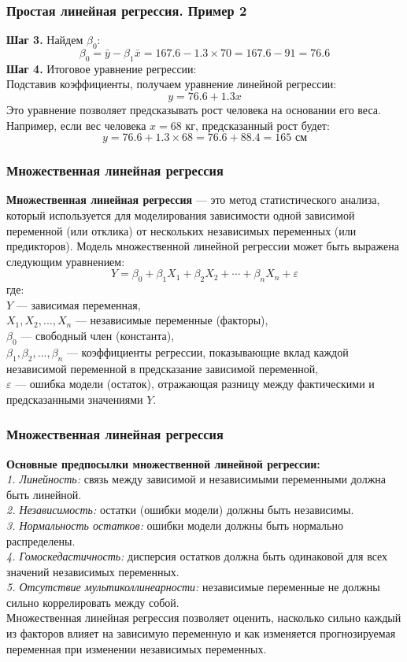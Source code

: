 \documentclass[aspectratio=169]{beamer}
\begin{document}
\begin{frame}
\frametitle{Простая линейная регрессия. Пример 2}
{\bf Шаг 3.} Найдем \( \beta_0 \):
\[
\beta_0 = \bar{y} - \beta_1 \bar{x} = 167.6 - 1.3 \times 70 = 167.6 - 91 = 76.6
\]
{\bf Шаг 4.} Итоговое уравнение регрессии:\\
Подставив коэффициенты, получаем уравнение линейной регрессии:
\[
y = 76.6 + 1.3x
\]
Это уравнение позволяет предсказывать рост человека на основании его веса. Например, если вес человека \( x = 68 \) кг, предсказанный рост будет:
\[
y = 76.6 + 1.3 \times 68 = 76.6 + 88.4 = 165 \text{ см}
\]
\end{frame}

\begin{frame}
\frametitle{Множественная линейная регрессия}
{\bf Множественная линейная регрессия} — это метод статистического анализа, который используется для моделирования зависимости одной зависимой переменной (или отклика) от нескольких независимых переменных (или предикторов). Модель множественной линейной регрессии может быть выражена следующим уравнением:
\[
Y = \beta_0 + \beta_1 X_1 + \beta_2 X_2 + \cdots + \beta_n X_n + \varepsilon
\]
где:\\
\quad \(Y\) — зависимая переменная,\\
\quad \(X_1, X_2, ..., X_n\) — независимые переменные (факторы),\\
\quad \(\beta_0\) — свободный член (константа),\\
\quad \(\beta_1, \beta_2, ..., \beta_n\) — коэффициенты регрессии, показывающие вклад каждой независимой переменной в предсказание зависимой переменной,\\
\quad \(\varepsilon\) — ошибка модели (остаток), отражающая разницу между фактическими и предсказанными значениями \(Y\).
\end{frame}

\begin{frame}
\frametitle{Множественная линейная регрессия}
{\bf Основные предпосылки множественной линейной регрессии:}\\
{\it 1. Линейность:} связь между зависимой и независимыми переменными должна быть линейной.\\
{\it 2. Независимость:} остатки (ошибки модели) должны быть независимы.\\
{\it 3. Нормальность остатков:} ошибки модели должны быть нормально распределены.\\
{\it 4. Гомоскедастичность:} дисперсия остатков должна быть одинаковой для всех значений независимых переменных.\\
{\it 5. Отсутствие мультиколлинеарности:} независимые переменные не должны сильно коррелировать между собой.
\newline\\
Множественная линейная регрессия позволяет оценить, насколько сильно каждый из факторов влияет на зависимую переменную и как изменяется прогнозируемая переменная при изменении независимых переменных.
\end{frame}
\end{document}
